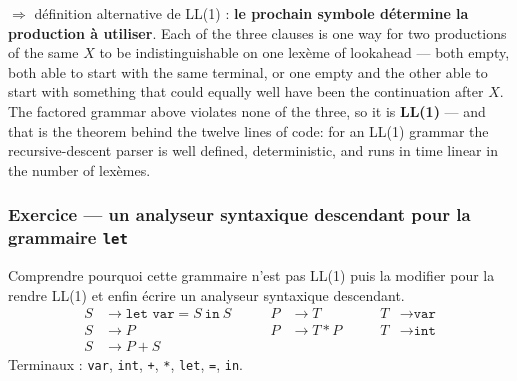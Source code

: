 \noindent $\Rightarrow$ définition alternative de LL(1) : \textbf{le prochain
symbole détermine la production à utiliser}. Each of the three clauses is one
way for two productions of the same $X$ to be indistinguishable on one lexème
of lookahead --- both empty,
both able to start with the same terminal, or one empty and the other able to
start with something that could equally well have been the continuation after
$X$.\\

The factored grammar above violates none of the three, so it is
\textbf{LL(1)} --- and that is the theorem behind the twelve lines of code: for
an LL(1) grammar the recursive-descent parser is well defined, deterministic,
and runs in time linear in the number of lexèmes.

\subsubsection{Exercice --- un analyseur syntaxique descendant pour la grammaire \texttt{let}}
\begin{problem}
  Comprendre pourquoi cette grammaire n'est pas LL(1) puis la modifier pour la
  rendre LL(1) et enfin écrire un analyseur syntaxique descendant.
  \[
    \begin{aligned}
      S &\to \texttt{let var} = S\ \texttt{in}\ S & \qquad P &\to T   & \qquad T &\to \texttt{var} \\
      S &\to P                                    & \qquad P &\to T*P & \qquad T &\to \texttt{int} \\
      S &\to P+S                                  &          &       &          &
    \end{aligned}
  \]
  Terminaux : \verb|var|, \verb|int|, \verb|+|, \verb|*|, \verb|let|, \verb|=|,
  \verb|in|.
\end{problem}

